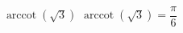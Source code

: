  {$\operatorname{arccot} \left( \sqrt{3} \right)$ }
{ $\operatorname{arccot} \left( \sqrt{3} \right) = \dfrac{\pi}{6}$}
